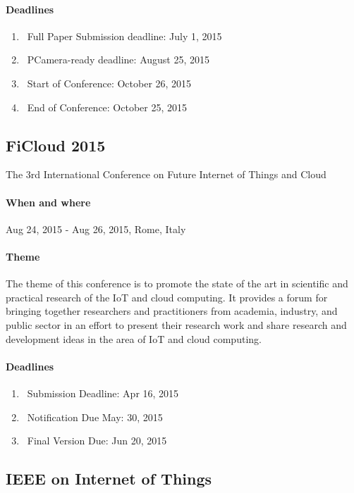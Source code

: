\documentclass[12pt]{article}
\begin{document}
\paragraph {Deadlines}
\begin{enumerate}
\item\ Full Paper Submission deadline: July 1, 2015
\item\ PCamera-ready deadline: August 25, 2015
\item\ Start of Conference: October 26, 2015
\item\ End of Conference: October 25, 2015
\end{enumerate}


\subsection{FiCloud 2015 } The 3rd International Conference on Future Internet of Things and Cloud

\paragraph {When and where} Aug 24, 2015 - Aug 26, 2015, Rome, Italy

\paragraph {Theme} The theme of this conference is to promote the state of the art in scientific and practical research of the IoT and cloud computing. It provides a forum for bringing together researchers and practitioners from academia, industry, and public sector in an effort to present their research work and share research and development ideas in the area of IoT and cloud computing. 

\paragraph {Deadlines} 
\begin{enumerate}
\item\ Submission Deadline:	Apr 16, 2015
\item\ Notification Due	May: 30, 2015
\item\ Final Version Due: Jun 20, 2015
\end{enumerate}


\subsection{IEEE on Internet of Things} 
\end{document}
